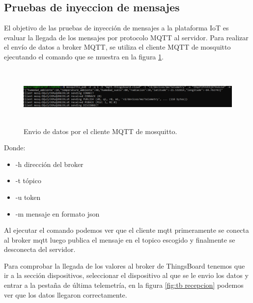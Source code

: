 \subsection{Pruebas de inyeccion de mensajes}
El objetivo de las pruebas de inyección de mensajes a la plataforma IoT es evaluar la llegada de los mensajes por protocolo MQTT al servidor.
Para realizar el envío de datos a broker MQTT, se utiliza el cliente MQTT de mosquitto ejecutando el comando que se muestra en la figura \ref{fig:mosquitto pub}.

\begin{figure}[h!]
  \centering
    \includegraphics[width=\linewidth, height=3cm]{./Figures/mosquito_enviodatos.png}
  \caption{Envio de datos por el cliente MQTT de mosquitto.}
    \label{fig:mosquitto pub}
\end{figure}

Donde:
\begin{itemize}
  \item -h dirección del broker
  \item -t tópico 
  \item -u token
  \item -m mensaje en formato json
\end{itemize}

Al ejecutar el comando podemos ver que el cliente mqtt primeramente se conecta al broker mqtt luego publica el mensaje en el topico escogido y finalmente se desconecta del servidor.

Para comprobar la llegada de los valores al broker de ThingsBoard tenemos que ir a la sección dispositivos, seleccionar el dispositivo al que se le envio los datos y entrar a la pestaña de última telemetría, en la figura \ref{fig:tb recepcion} podemos ver que los datos llegaron correctamente.


